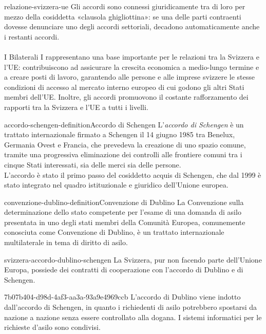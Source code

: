 \documentclass[preview]{standalone}
\begin{document}
\begin{snippet}{relazione-svizzera-ue}
    Gli accordi sono connessi giuridicamente tra di loro per mezzo della cosiddetta
    «clausola ghigliottina»:
    se una delle parti contraenti dovesse denunciare uno degli accordi settoriali,
    decadono automaticamente anche i restanti accordi.
    \\\\
    I Bilaterali I rappresentano una base importante per le relazioni
    tra la Svizzera e l'UE: contribuiscono ad assicurare
    la crescita economica a medio-lungo termine e a
    creare posti di lavoro, garantendo alle persone e alle
    imprese svizzere le stesse condizioni di accesso al mercato
    interno europeo di cui godono gli altri Stati membri dell'UE.
    Inoltre, gli accordi promuovono il costante rafforzamento dei
    rapporti tra la Svizzera e l'UE a tutti i livelli.
\end{snippet}

\begin{snippetdefinition}{accordo-schengen-definition}{Accordo di Schengen}
    L'\textit{accordo di Schengen} è un trattato internazionale firmato a
    Schengen il 14 giugno 1985 tra Benelux, Germania Ovest e Francia,
    che prevedeva la creazione di uno spazio comune, tramite una progressiva eliminazione
    dei controlli alle frontiere comuni tra i cinque Stati interessati,
    sia delle merci sia delle persone.
    \\
    L'accordo è stato il primo passo del cosiddetto acquis di Schengen,
    che dal 1999 è stato integrato nel quadro istituzionale e
    giuridico dell'Unione europea.
\end{snippetdefinition}

\begin{snippetdefinition}{convenzione-dublino-definition}{Convenzione di Dublino}
    La Convenzione sulla determinazione dello stato competente per l'esame di una domanda di asilo presentata
    in uno degli stati membri della Comunità Europea,
    comunemente conosciuta come Convenzione di Dublino, è un trattato
    internazionale multilaterale in tema di diritto di asilo. 
\end{snippetdefinition}

\begin{snippet}{svizzera-accordo-dublino-schengen}
    La Svizzera, pur non facendo parte dell'Unione Europa, possiede dei contratti di
    cooperazione con l'accordo di Dublino e di Schengen.
\end{snippet}

\begin{snippet}{7b07b404-d98d-4af3-aa3a-93a9e4969ccb}
    L'accordo di Dublino viene indotto dall'accordo di Schengen, in quanto
    i richiedenti di asilo potrebbero spostarsi da nazione a nazione senza
    essere controllato alla dogana. I sistemi informatici per le richieste d'asilo sono
    condivisi.
\end{snippet}
\end{document}
